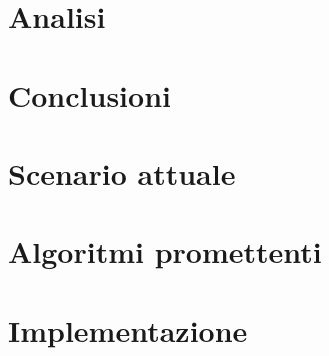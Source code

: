 \documentclass[12pt,twoside]{report}
\begin{document}
\chapter{Analisi}


\chapter{Conclusioni}


\appendix
\chapter{Scenario attuale}


\chapter{Algoritmi promettenti}


\chapter{Implementazione}


{}

\end{document}
